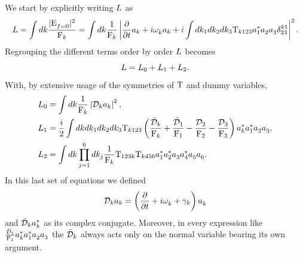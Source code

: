 We start by explicitly writing $L$ as
\begin{equation}
    L = \int dk \frac{|\mathrm{E}_{f=0}^{}|^2}{\mathrm{F}_k} = \int dk \frac{1}{\mathrm{F}_k} \left| \frac{\partial}{\partial t} a_k + i \omega^{}_k a_k + i \int dk_1 dk_2 dk_3\mathrm{T}_{k123} a_1^*a_2^{}a_3^{} \delta^{k1}_{23} \right|^2.
\end{equation} 
Regrouping the different terms order by order $L$ becomes 
\begin{equation}
    L = L_0 + L_1 + L_2.
\end{equation}
With, by extensive usage of the symmetries of $\mathrm{T}$ and dummy variables, 
\begin{align}
    L_0 &= \int dk\frac{1}{\mathrm{F}_k} \left| \mathcal{D}_k a_k  \right|^2, \\
    L_1 &= \frac{i}{2}\int dk dk_1 dk_2 dk_3 \mathrm{T}_{k123}\left( \frac{\bar{\mathcal{D}}_k}{\mathrm{F}_k} + \frac{\bar{\mathcal{D}}_1}{\mathrm{F}_1} - \frac{\mathcal{D}_2}{\mathrm{F}_2} - \frac{\mathcal{D}_3}{\mathrm{F}_3} \right)
    a_k^* a_1^* a_2^{} a_3^{}, \\
    L_2 &= \int dk\prod_{j=1}^{6}dk_j \frac{1}{\mathrm{F}_k}\mathrm{T}_{123k}\mathrm{T}_{k456}a_1^* a_2^* a_3^{} a_4^* a_5^{} a_6^{}. 
\end{align}
In this last set of equations we defined 
\begin{equation}
    \mathcal{D}_k a_k = \left(\frac{\partial}{\partial t} + i\omega^{}_k+ \gamma_k\right)a_k^{}
\end{equation} 
and $\bar{\mathcal{D}}_k a_k^*$ as its complex conjugate. Moreover, in every expression 
like $\frac{\bar{\mathcal{D}}_1}{\mathrm{F}_1}a_k^* a_1^* a_2^{} a_3^{}$ the $\bar{\mathcal{D}}_k$ always acts only on the normal variable bearing its own argument. \\

